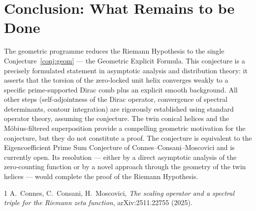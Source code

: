 \documentclass[12pt,a4paper]{article}
\begin{document}
\section{Conclusion: What Remains to be Done}

The geometric programme reduces the Riemann Hypothesis to the single Conjecture~\ref{conj:geom} — the Geometric Explicit Formula.  This conjecture is a precisely formulated statement in asymptotic analysis and distribution theory: it asserts that the torsion of the zero‑locked unit helix converges weakly to a specific prime‑supported Dirac comb plus an explicit smooth background.  All other steps (self‑adjointness of the Dirac operator, convergence of spectral determinants, contour integration) are rigorously established using standard operator theory, assuming the conjecture.  The twin conical helices and the M\"obius‑filtered superposition provide a compelling geometric motivation for the conjecture, but they do not constitute a proof.  The conjecture is equivalent to the Eigencoefficient Prime Sum Conjecture of Connes–Consani–Moscovici and is currently open.  Its resolution — either by a direct asymptotic analysis of the zero‑counting function or by a novel approach through the geometry of the twin helices — would complete the proof of the Riemann Hypothesis.

\begin{thebibliography}{1}
A.~Connes, C.~Consani, H.~Moscovici,
\emph{The scaling operator and a spectral triple for the Riemann zeta function},
arXiv:2511.22755 (2025).
\end{thebibliography}
\end{document}
